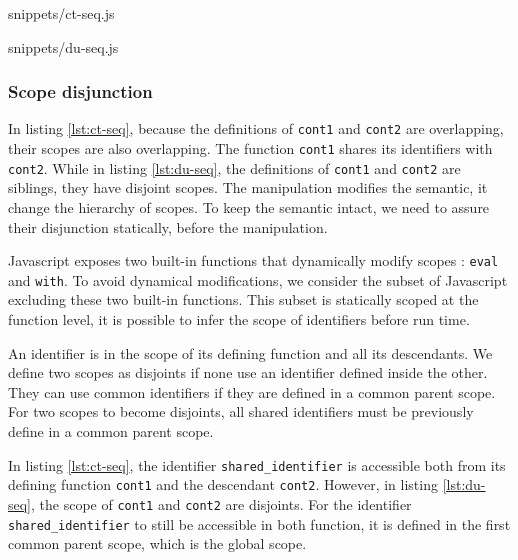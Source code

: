              {snippets/ct-seq.js}

             {snippets/du-seq.js}

\subsubsection{Scope disjunction} \label{section:equivalence:composition:disjunction}

In listing \ref{lst:ct-seq}, because the definitions of \texttt{cont1} and \texttt{cont2} are overlapping, their scopes are also overlapping.
The function \texttt{cont1} shares its identifiers with \texttt{cont2}.
While in listing \ref{lst:du-seq}, the definitions of \texttt{cont1} and \texttt{cont2} are siblings, they have disjoint scopes.
The manipulation modifies the semantic, it change the hierarchy of scopes.
To keep the semantic intact, we need to assure their disjunction statically, before the manipulation.

Javascript exposes two built-in functions that dynamically modify scopes : \texttt{eval} and \texttt{with}.
To avoid dynamical modifications, we consider the subset of Javascript excluding these two built-in functions.
This subset is statically scoped at the function level, it is possible to infer the scope of identifiers before run time.

An identifier is in the scope of its defining function and all its descendants.
We define two scopes as disjoints if none use an identifier defined inside the other.
They can use common identifiers if they are defined in a common parent scope.
For two scopes to become disjoints, all shared identifiers must be previously define in a common parent scope.

In listing \ref{lst:ct-seq}, the identifier \texttt{shared\_identifier} is accessible both from its defining function \texttt{cont1} and the descendant \texttt{cont2}.
However, in listing \ref{lst:du-seq}, the scope of \texttt{cont1} and \texttt{cont2} are disjoints.
For the identifier \texttt{shared\_identifier} to still be accessible in both function, it is defined in the first common parent scope, which is the global scope.

